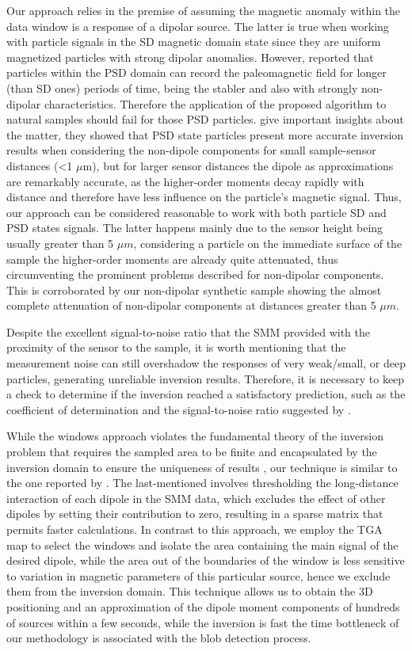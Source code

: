 Our approach relies in the premise of assuming the magnetic anomaly within
the data window is a response of a dipolar source.
The latter is true when working
with particle signals in the SD magnetic domain state since they are uniform magnetized particles with strong dipolar anomalies.
However, \cite{Nagy2017} reported that particles within the PSD domain can record the paleomagnetic field for longer (than SD ones) periods of time, being the stabler and also with strongly non-dipolar characteristics.
Therefore the application of the proposed algorithm to natural samples should fail for those PSD particles.
\cite{CortesOrtuno2022} give important insights about the matter, they showed that PSD state particles present more accurate inversion results when considering the non-dipole components for small sample-sensor distances (\textless 1 $\mu$m), but for larger sensor distances the dipole as approximations are remarkably accurate, as the higher-order moments decay rapidly with distance and therefore have less
influence on the particle's magnetic signal.
Thus, our approach can be considered reasonable to work with both particle SD and PSD states signals.
The latter happens mainly due to the sensor height being usually greater than 5 $\mu m$, considering a particle on the immediate surface of the sample the higher-order moments are already quite attenuated, thus circumventing the prominent problems described for non-dipolar components. This is corroborated by our non-dipolar synthetic sample showing the almost complete attenuation of non-dipolar components at distances greater than 5 $\mu m$.

Despite the excellent signal-to-noise ratio that the SMM provided with the
proximity of the sensor to the sample, it is worth mentioning that the
measurement noise can still overshadow the responses of very weak/small, or
deep particles, generating unreliable inversion results.
Therefore, it is necessary to keep a check to determine if the inversion reached a satisfactory prediction, such as the coefficient of determination and the
signal-to-noise ratio suggested by \citep{CortesOrtuno2021}.

While the windows approach violates the fundamental theory of the inversion problem that  requires the sampled area to be finite and encapsulated by the inversion domain to ensure the uniqueness of results \citep{Baratchart2013,Lima2013}, our technique is similar to the  one reported by \cite{Weiss2007}.
The last-mentioned involves thresholding the long-distance interaction
of each dipole in the SMM data, which excludes the effect of other dipoles by setting their contribution to zero, resulting in a sparse matrix that permits faster calculations.
In contrast to this approach, we employ the TGA map to select the windows and isolate the area containing the main signal of the desired dipole, while the area out of the boundaries of the window is less sensitive to variation in magnetic parameters of this particular source, hence we exclude them from the inversion domain.
This technique allows us to obtain the 3D positioning and an approximation of the dipole moment components of hundreds of sources within a few seconds, while the inversion is fast the time bottleneck of our methodology is associated with the blob detection process.


